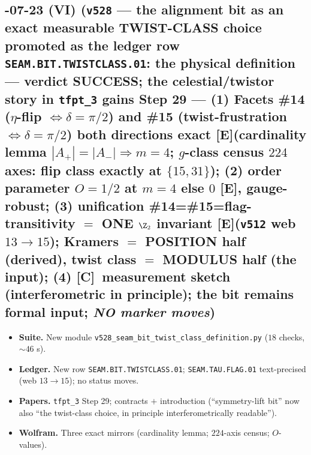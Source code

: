\documentclass[11pt]{article}
\providecommand{\mE}{\textbf{[E]}}\providecommand{\mC}{\textbf{[C]}}
\providecommand{\vref}[1]{\texttt{#1}}
\begin{document}
\subsection*{-07-23 (VI) (\texttt{v528} --- the alignment bit as an exact measurable TWIST-CLASS choice promoted as the ledger row \texttt{SEAM.BIT.TWISTCLASS.01}: the physical definition --- verdict SUCCESS; the celestial/twistor story in \texttt{tfpt\_3} gains Step 29 --- (1) Facets \#14 ($\eta$-flip $\Leftrightarrow\delta=\pi/2$) and \#15 (twist-frustration $\Leftrightarrow\delta=\pi/2$) both directions exact \mE (cardinality lemma $|A_+|=|A_-|\Rightarrow m=4$; $g$-class census $224$ axes: flip class exactly at $\{15,31\}$); (2) order parameter $O=1/2$ at $m=4$ else $0$ \mE, gauge-robust; (3) unification \#14=\#15=flag-transitivity $=$ ONE $\Z_2$ invariant \mE (\vref{v512} web $13\to15$); Kramers $=$ POSITION half (derived), twist class $=$ MODULUS half (the input); (4) \mC\ measurement sketch (interferometric in principle); the bit remains formal input; \emph{NO marker moves})}
\begin{itemize}[leftmargin=1.5em]
\item \textbf{Suite.} New module \texttt{v528\_seam\_bit\_twist\_class\_definition.py} ($18$ checks, $\sim46$ s).
\item \textbf{Ledger.} New row \texttt{SEAM.BIT.TWISTCLASS.01}; \texttt{SEAM.TAU.FLAG.01} text-precised
(web $13\to15$); no status moves.
\item \textbf{Papers.} \texttt{tfpt\_3} Step 29; contracts $+$ introduction (``symmetry-lift bit'' now also
``the twist-class choice, in principle interferometrically readable'').
\item \textbf{Wolfram.} Three exact mirrors (cardinality lemma; $224$-axis census; $O$-values).
\end{itemize}
\end{document}
